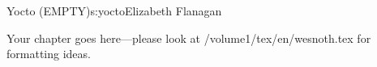\begin{aosachapter}{Yocto (EMPTY)}{s:yocto}{Elizabeth Flanagan}

Your chapter goes here---please look at /volume1/tex/en/wesnoth.tex for 
formatting ideas.

\end{aosachapter}
